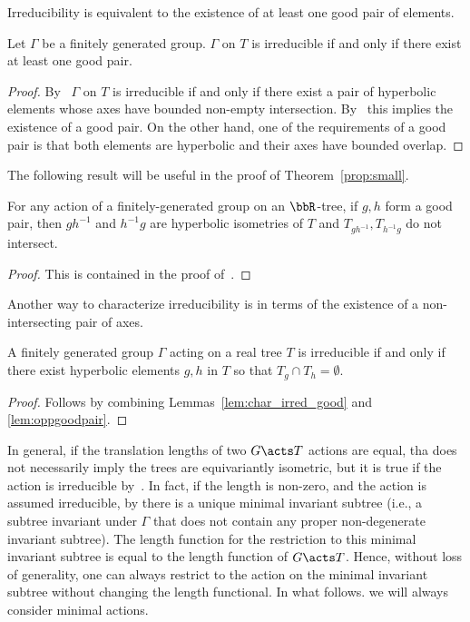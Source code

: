 Irreducibility is equivalent to the existence of at least one good pair of elements.

\begin{lemma}
Let $\Gamma$ be a finitely generated group. $\Gamma$ on $T$ is irreducible if and only if there exist at least one good pair.
\label{lem:char_irred_good}
\end{lemma}
\begin{proof}
By~\cite[Theorem~2.7]{CM87:GroupActions} $\Gamma$ on $T$ is irreducible if and only if there exist a pair of hyperbolic elements whose axes have bounded non-empty intersection. By~\cite[Theorem~3.3]{CM87:GroupActions} this implies the existence of a good pair. On the other hand, one of the requirements of a good pair is that both elements are hyperbolic and their axes have bounded overlap.
\end{proof}


The following result will be useful in the proof of Theorem~\ref{prop:small}.

\begin{lemma}
  For any action of a finitely-generated group on an $\bbR$-tree, if $g,h$ form a good pair, then $gh^{-1}$ and $h^{-1}g$ are hyperbolic isometries of $T$ and $T_{gh^{-1}}, T_{h^{-1}g}$ do not intersect.
    \label{lem:oppgoodpair}
\end{lemma}
\begin{proof}
   This is contained in the proof of~\cite[Lemma~3.4]{CM87:GroupActions}.
\end{proof}


Another way to characterize irreducibility is in terms of the existence of a non-intersecting pair of axes.
\begin{lemma}
A finitely generated group $\Gamma$  acting on a real tree $T$ is irreducible if and only if there exist hyperbolic elements $g,h$ in $T$ so that $T_g \cap T_h = \emptyset$.
\label{lem:char_irred_noninter}
\end{lemma}
\begin{proof}
Follows by combining Lemmas~\ref{lem:char_irred_good} and \ref{lem:oppgoodpair}.
\end{proof}



In general, if the translation lengths of two $G \acts T$ actions are equal, tha does not necessarily imply the trees are equivariantly isometric, but it is true if the action is irreducible by~\cite[Theorem~3.7]{CM87:GroupActions}.
In fact, if the length is non-zero, and the action is assumed irreducible, by \cite[Proposition~3.1]{CM87:GroupActions} there is a unique minimal invariant subtree (i.e., a subtree invariant under $\Gamma$ that does not contain any proper non-degenerate invariant subtree). The length function for the restriction to this minimal invariant subtree is equal to the length function of $G  \acts T$. Hence, without loss of generality, one can always restrict to the action on the minimal invariant subtree without changing the length functional. In what follows. we will always consider minimal actions.

